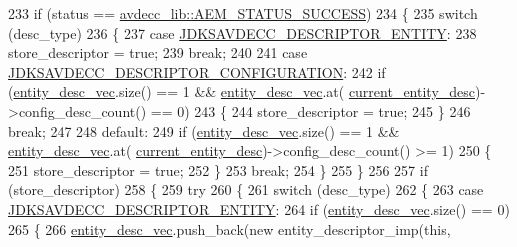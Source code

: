 \begin{DoxyCode}
233     \textcolor{keywordflow}{if} (status == \hyperlink{namespaceavdecc__lib_affd436edb2cecd20cfd784a84f852b2bac947077909cb590b84f4b5db413080e0}{avdecc\_lib::AEM\_STATUS\_SUCCESS})
234     \{
235         \textcolor{keywordflow}{switch} (desc\_type)
236         \{
237         \textcolor{keywordflow}{case} \hyperlink{group__descriptor_gaf06b7a0bf808dc8e3104511947d694c4}{JDKSAVDECC\_DESCRIPTOR\_ENTITY}:
238             store\_descriptor = \textcolor{keyword}{true};
239             \textcolor{keywordflow}{break};
240 
241         \textcolor{keywordflow}{case} \hyperlink{group__descriptor_ga645687847f92dc28bcb37a7c334cb875}{JDKSAVDECC\_DESCRIPTOR\_CONFIGURATION}:
242             \textcolor{keywordflow}{if} (\hyperlink{classavdecc__lib_1_1end__station__imp_a72edab41bc56e3c1757944a7df188a3d}{entity\_desc\_vec}.size() == 1 && \hyperlink{classavdecc__lib_1_1end__station__imp_a72edab41bc56e3c1757944a7df188a3d}{entity\_desc\_vec}.at(
      \hyperlink{classavdecc__lib_1_1end__station__imp_afd78c89df26ba7641e1adb764c0e827d}{current\_entity\_desc})->config\_desc\_count() == 0)
243             \{
244                 store\_descriptor = \textcolor{keyword}{true};
245             \}
246             \textcolor{keywordflow}{break};
247 
248         \textcolor{keywordflow}{default}:
249             \textcolor{keywordflow}{if} (\hyperlink{classavdecc__lib_1_1end__station__imp_a72edab41bc56e3c1757944a7df188a3d}{entity\_desc\_vec}.size() == 1 && \hyperlink{classavdecc__lib_1_1end__station__imp_a72edab41bc56e3c1757944a7df188a3d}{entity\_desc\_vec}.at(
      \hyperlink{classavdecc__lib_1_1end__station__imp_afd78c89df26ba7641e1adb764c0e827d}{current\_entity\_desc})->config\_desc\_count() >= 1)
250             \{
251                 store\_descriptor = \textcolor{keyword}{true};
252             \}
253             \textcolor{keywordflow}{break};
254         \}
255     \}
256 
257     \textcolor{keywordflow}{if} (store\_descriptor)
258     \{
259         \textcolor{keywordflow}{try}
260         \{
261             \textcolor{keywordflow}{switch} (desc\_type)
262             \{
263             \textcolor{keywordflow}{case} \hyperlink{group__descriptor_gaf06b7a0bf808dc8e3104511947d694c4}{JDKSAVDECC\_DESCRIPTOR\_ENTITY}:
264                 \textcolor{keywordflow}{if} (\hyperlink{classavdecc__lib_1_1end__station__imp_a72edab41bc56e3c1757944a7df188a3d}{entity\_desc\_vec}.size() == 0)
265                 \{
266                     \hyperlink{classavdecc__lib_1_1end__station__imp_a72edab41bc56e3c1757944a7df188a3d}{entity\_desc\_vec}.push\_back(\textcolor{keyword}{new} entity\_descriptor\_imp(\textcolor{keyword}{this}, 

\end{DoxyCode}
